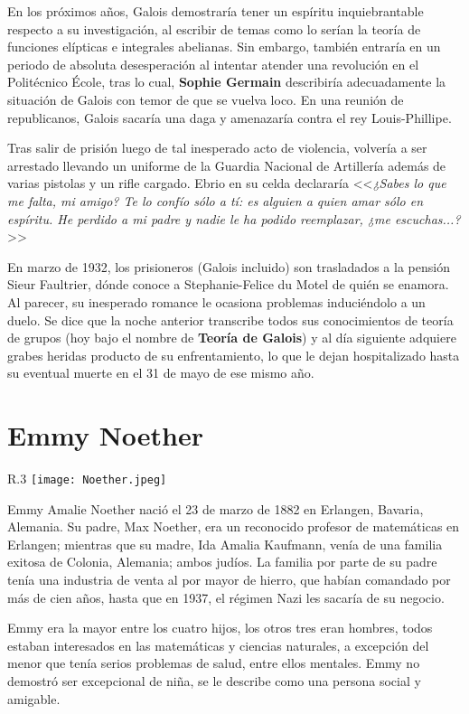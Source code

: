 \documentclass[11pt,oneside]{book}
\begin{document}
En los próximos años, Galois demostraría tener un espíritu inquiebrantable respecto a su investigación, al escribir de temas como lo serían la teoría de funciones elípticas e integrales abelianas. Sin embargo, también entraría en un periodo de absoluta desesperación al intentar atender una revolución en el Politécnico École, tras lo cual, \textbf{Sophie Germain} describiría adecuadamente la situación de Galois con temor de que se vuelva loco. En una reunión de republicanos, Galois sacaría una daga y amenazaría contra el rey Louis-Phillipe.

Tras salir de prisión luego de tal inesperado acto de violencia, volvería a ser arrestado llevando un uniforme de la Guardia Nacional de Artillería además de varias pistolas y un rifle cargado. Ebrio en su celda declararía <<\textit{¿Sabes lo que me falta, mi amigo? Te lo confío sólo a tí: es alguien a quien amar sólo en espíritu. He perdido a mi padre y nadie le ha podido reemplazar, ¿me escuchas...?}>>

En marzo de 1932, los prisioneros (Galois incluido) son trasladados a la pensión Sieur Faultrier, dónde conoce a Stephanie-Felice du Motel de quién se enamora. Al parecer, su inesperado romance le ocasiona problemas induciéndolo a un duelo. Se dice que la noche anterior transcribe todos sus conocimientos de teoría de grupos (hoy bajo el nombre de \textbf{Teoría de Galois}) y al día siguiente adquiere grabes heridas producto de su enfrentamiento, lo que le dejan hospitalizado hasta su eventual muerte en el 31 de mayo de ese mismo año.

\section{Emmy Noether}
\begin{wrapfigure}{R}{.3\textwidth}
\texttt{[image: Noether.jpeg]}
\caption{}
\end{wrapfigure}
Emmy Amalie Noether nació el 23 de marzo de 1882 en Erlangen, Bavaria, Alemania. Su padre, Max Noether, era un reconocido profesor de matemáticas en Erlangen; mientras que su madre, Ida Amalia Kaufmann, venía de una familia exitosa de Colonia, Alemania; ambos judíos. La familia por parte de su padre tenía una industria de venta al por mayor de hierro, que habían comandado por más de cien años, hasta que en 1937, el régimen Nazi les sacaría de su negocio.

Emmy era la mayor entre los cuatro hijos, los otros tres eran hombres, todos estaban interesados en las matemáticas y ciencias naturales, a excepción del menor que tenía serios problemas de salud, entre ellos mentales. Emmy no demostró ser excepcional de niña, se le describe como una persona social y amigable.
\end{document}

